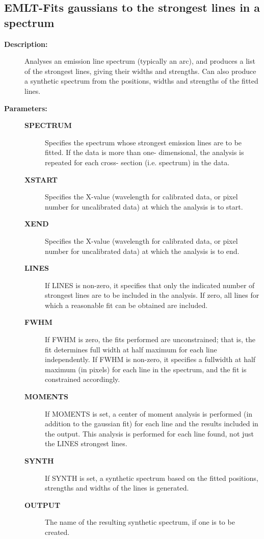 \begin{description}
\subsection{EMLT-\label{EMLT}Fits gaussians to the strongest lines in a spectrum}
\begin{description}

\item [\textbf{Description:}]
 Analyses an emission line spectrum (typically an arc), and
 produces a list of the strongest lines, giving their widths
 and strengths.  Can also produce a synthetic spectrum from
 the positions, widths and strengths of the fitted lines.

\item [\textbf{Parameters:}]
\begin{description}
\item [\textbf{SPECTRUM}]
 Specifies the spectrum whose strongest emission
 lines are to be fitted.  If the data is more than one-
 dimensional, the analysis is repeated for each cross-
 section (i.e. spectrum) in the data.
\item [\textbf{XSTART}]
 Specifies the X-value (wavelength for calibrated
 data, or pixel number for uncalibrated data) at which
 the analysis is to start.
\item [\textbf{XEND}]
 Specifies the X-value (wavelength for calibrated
 data, or pixel number for uncalibrated data) at which
 the analysis is to end.
\item [\textbf{LINES}]
 If LINES is non-zero, it specifies that only the
 indicated number of strongest lines are to be included
 in the analysis.  If zero, all lines for which a
 reasonable fit can be obtained are included.
\item [\textbf{FWHM}]
 If FWHM is zero, the fits performed are unconstrained;
 that is, the fit determines full width at half maximum
 for each line independently.  If FWHM is non-zero, it
 specifies a fullwidth at half maximum (in pixels) for
 each line in the spectrum, and the fit is constrained
 accordingly.
\item [\textbf{MOMENTS}]
 If MOMENTS is set, a center of moment analysis is
 performed (in addition to the gaussian fit) for
 each line and the results included in the output.
 This analysis is performed for each line found, not
 just the LINES strongest lines.
\item [\textbf{SYNTH}]
 If SYNTH is set, a synthetic spectrum based on the
 fitted positions, strengths and widths of the lines
 is generated.
\item [\textbf{OUTPUT}]
 The name of the resulting synthetic spectrum, if one
 is to be created.
\end{description}


\end{description}
\end{description}
